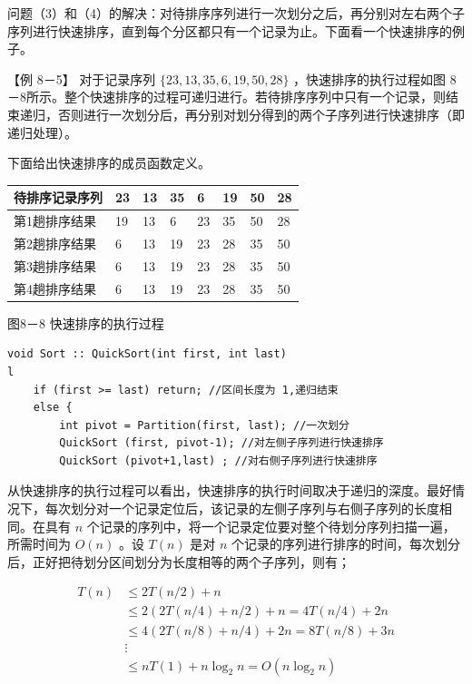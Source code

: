 \documentclass[10pt]{article}
\begin{document}
问题（3）和（4）的解决：对待排序序列进行一次划分之后，再分别对左右两个子序列进行快速排序，直到每个分区都只有一个记录为止。下面看一个快速排序的例子。

【例 8－5】 对于记录序列 $\{23,13,35,6,19,50,28\}$ ，快速排序的执行过程如图 8－8所示。整个快速排序的过程可递归进行。若待排序序列中只有一个记录，则结束递归，否则进行一次划分后，再分别对划分得到的两个子序列进行快速排序（即递归处理）。

下面给出快速排序的成员函数定义。

\begin{center}
\begin{tabular}{|l|l|l|l|l|l|l|l|}
\hline
待排序记录序列 & 23 & 13 & 35 & 6 & 19 & 50 & 28 \\
\hline
第1趟排序结果 & 19 & 13 & 6 & 23 & 35 & 50 & 28 \\
\hline
第2趟排序结果 & 6 & 13 & 19 & 23 & 28 & 35 & 50 \\
\hline
第3趟排序结果 & 6 & 13 & 19 & 23 & 28 & 35 & 50 \\
\hline
第4趟排序结果 & 6 & 13 & 19 & 23 & 28 & 35 & 50 \\
\hline
\end{tabular}
\end{center}

图8－8 快速排序的执行过程

\begin{verbatim}
void Sort :: QuickSort(int first, int last)
l
    if (first >= last) return; //区间长度为 1,递归结束
    else {
        int pivot = Partition(first, last); //一次划分
        QuickSort (first, pivot-1); //对左侧子序列进行快速排序
        QuickSort (pivot+1,last) ; //对右侧子序列进行快速排序
\end{verbatim}

从快速排序的执行过程可以看出，快速排序的执行时间取决于递归的深度。最好情况下，每次划分对一个记录定位后，该记录的左侧子序列与右侧子序列的长度相同。在具有 $n$ 个记录的序列中，将一个记录定位要对整个待划分序列扫描一遍，所需时间为 $O(n)$ 。设 $T(n)$ 是对 $n$ 个记录的序列进行排序的时间，每次划分后，正好把待划分区间划分为长度相等的两个子序列，则有；

$$
\begin{aligned}
T(n) & \leqslant 2 T(n / 2)+n \\
& \leqslant 2(2 T(n / 4)+n / 2)+n=4 T(n / 4)+2 n \\
& \leqslant 4(2 T(n / 8)+n / 4)+2 n=8 T(n / 8)+3 n \\
& \vdots \\
& \leqslant n T(1)+n \log _{2} n=O\left(n \log _{2} n\right)
\end{aligned}
$$
\end{document}
